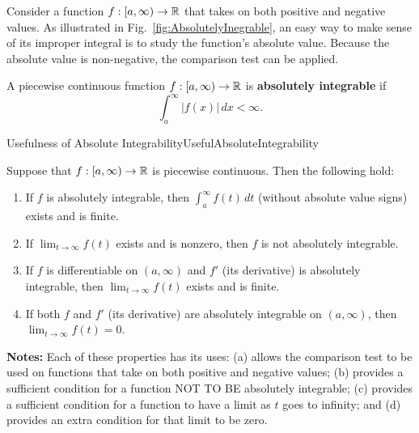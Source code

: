 Consider a function $f:[a, \infty) \to \mathbb R$ that takes on both positive and negative values. As illustrated in Fig.~\ref{fig:AbsolutelyInegrable}, an easy way to make sense of its improper integral is to study the function's absolute value. Because the absolute value is non-negative, the comparison test can be applied. 

\bigskip

\begin{tcolorbox}[colback=mylightblue, title = {\bf Absolute Integrability}, breakable]
\begin{definition}
\label{def:AbsolutelyIntegrable}
A piecewise continuous function $f:[a, \infty) \to  \mathbb R$ is \textbf{absolutely integrable} if 
\begin{equation}
    \label{eq:AbsolutelyIntegrable}
    \int_a^\infty |f(x)| \, dx < \infty.
\end{equation}

\end{definition}

\end{tcolorbox}

\bigskip

\begin{propColor}{Usefulness of Absolute Integrability}{UsefulAbsoluteIntegrability}

Suppose that $f:[a, \infty) \to \mathbb R$ is piecewise continuous. Then the following hold:
\begin{enumerate}
\renewcommand{\labelenumi}{(\alph{enumi})}
\setlength{\itemsep}{.2cm}
    \item If $f$ is absolutely integrable, then $\int_a^\infty f(t) \, dt $ (without absolute value signs) exists and is finite.
    \item If $\displaystyle \lim_{t \to \infty} f(t)$ exists and is nonzero, then $f$ is not absolutely integrable.
    \item If $f$ is differentiable on $(a, \infty)$ and $f'$ (its derivative) is absolutely integrable, then $ \displaystyle \lim_{t \to \infty} f(t)$ exists and is finite. 
    \item If both $f$ and $f'$ (its derivative) are absolutely integrable on $(a, \infty)$, then $ \displaystyle \lim_{t \to \infty} f(t) = 0.$ 
\end{enumerate}

\bigskip
\textbf{Notes:} Each of these properties has its uses: (a) allows the comparison test to be used on functions that take on both positive and negative values; (b) provides a sufficient condition for a function NOT TO BE absolutely integrable; (c) provides a sufficient condition for a function to have a limit as $t$ goes to infinity; and (d) provides an extra condition for that limit to be zero.
    
\end{propColor}

